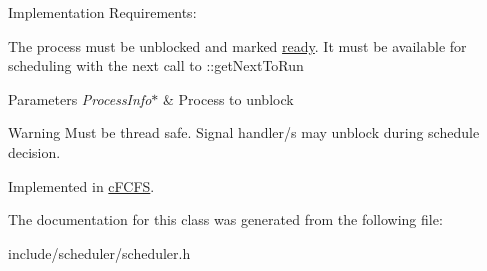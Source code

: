 \-Implementation \-Requirements\-: \begin{DoxyItemize}
\item \-The process must be unblocked and marked \hyperlink{process_8h_a2c72cb00af5be695c1f898162350821fa3d4001ca586c857718be397374082d76}{ready}. \-It must be available for scheduling with the next call to \-::get\-Next\-To\-Run\end{DoxyItemize}

\begin{DoxyParams}{\-Parameters}
{\em \-Process\-Info$\ast$} & \-Process to unblock\\
\hline
\end{DoxyParams}
\begin{DoxyWarning}{\-Warning}
\-Must be thread safe. \-Signal handler/s may unblock during schedule decision. 
\end{DoxyWarning}


\-Implemented in \hyperlink{classcFCFS_a793da0298f9b36ab8505a0e3daaf41ec}{c\-F\-C\-F\-S}.



\-The documentation for this class was generated from the following file\-:\begin{DoxyCompactItemize}
\item 
include/scheduler/scheduler.\-h\end{DoxyCompactItemize}
